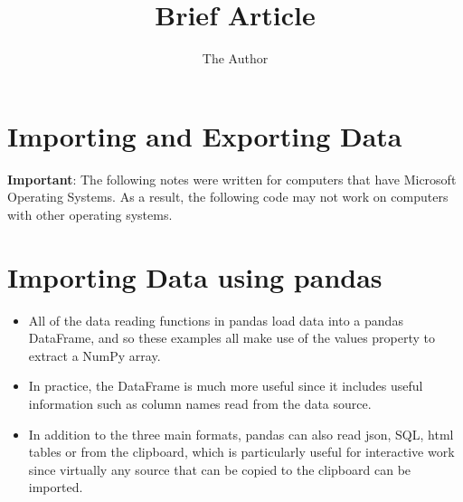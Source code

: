 \documentclass[11pt]{article} %
\title{Brief Article}
\author{The Author}
\begin{document}
	\large
	\setcounter{tocdepth}{2}
	
	
	
	
	\section*{Importing and Exporting Data}
	
	\begin{framed}
		\noindent \textbf{Important}: The following notes were written for computers that have Microsoft Operating Systems. As a result, the following code may not work on computers with other operating systems.
	\end{framed}
	\section{Importing Data using pandas}
	
	
	\begin{itemize}
		\item All of the data reading functions in pandas load data into a pandas
		DataFrame, and so these examples all make use of the values property to extract a
		NumPy array. 
		
		\item In practice, the DataFrame is much more useful since it includes useful information such
		as column names read from the data source. \item
		In addition to the three main formats, pandas can
		also read json, SQL, html tables or from the clipboard, which is particularly useful for interactive work
		since virtually any source that can be copied to the clipboard can be imported.
	\end{itemize}
	
\end{document}
